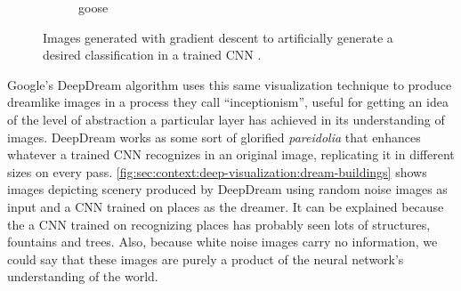 \begin{figure}[htbp]
\begin{subfigure}[b]{0.3\textwidth}
    \caption{goose}
    \label{fig:sec:context:deep-visualization-class-6}
  \end{subfigure}
  \caption{
    Images generated with gradient descent to artificially generate a desired classification in a trained CNN \cite{Simonyan2014B}.
  }
  \label{fig:sec:context:deep-visualization-class}
\end{figure}

Google's DeepDream algorithm \cite{Mordvintsev2015} uses this same visualization technique to produce dreamlike images in a process they call ``inceptionism'', useful for getting an idea of the level of abstraction a particular layer has achieved in its understanding of images.
DeepDream works as some sort of glorified \emph{pareidolia} that enhances whatever a trained CNN recognizes in an original image, replicating it in different sizes on every pass.
\autoref{fig:sec:context:deep-visualization:dream-buildings} shows images depicting scenery produced by DeepDream using random noise images as input and a CNN trained on places as the dreamer.
It can be explained because the a CNN trained on recognizing places has probably seen lots of structures, fountains and trees.
Also, because white noise images carry no information, we could say that these images are purely a product of the neural network's understanding of the world.


